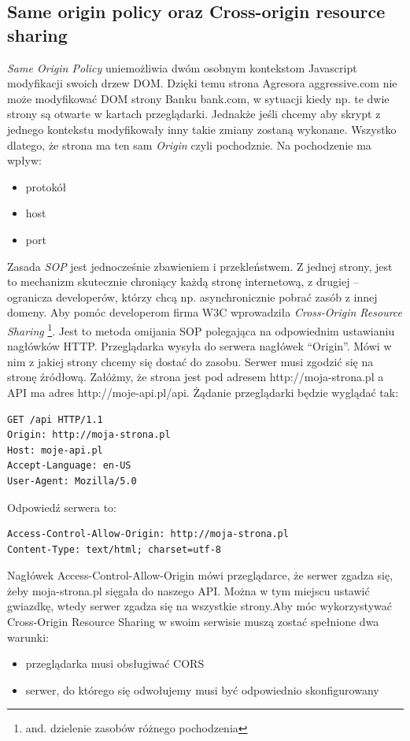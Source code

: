 \documentclass[brudnopis]{xmgr}
\begin{document}
\subsection{Same origin policy oraz Cross-origin resource sharing} 
\textit{Same Origin Policy} uniemożliwia dwóm osobnym kontekstom Javascript modyfikacji swoich drzew DOM. Dzięki temu strona Agresora aggressive.com nie może modyfikować DOM strony Banku bank.com, w sytuacji kiedy np. te dwie strony są otwarte w kartach przeglądarki. Jednakże jeśli chcemy aby skrypt z jednego kontekstu modyfikowały inny takie zmiany zostaną wykonane. Wszystko dlatego, że strona ma ten sam \textit{Origin} czyli pochodznie. Na pochodzenie ma wpływ:
\begin{itemize}
\item protokół
\item host
\item port
\end{itemize}
Zasada \textit{SOP} jest jednocześnie zbawieniem i przekleństwem. Z jednej strony, jest to mechanizm skutecznie chroniący każdą stronę internetową, z drugiej – ogranicza developerów, którzy chcą np. asynchronicznie pobrać zasób z innej domeny. Aby pomóc developerom firma W3C wprowadziła \textit{Cross-Origin Resource Sharing} \footnote{and. dzielenie zasobów różnego pochodzenia}. Jest to metoda omijania SOP polegająca na odpowiednim ustawianiu nagłówków HTTP. Przeglądarka wysyła do serwera nagłówek “Origin”. Mówi w nim z jakiej strony chcemy się dostać do zasobu. Serwer musi zgodzić się na stronę źródłową. Załóżmy, że strona jest pod adresem http://moja-strona.pl a API ma adres http://moje-api.pl/api. Żądanie przeglądarki będzie wyglądać tak:
\begin{verbatim}
GET /api HTTP/1.1
Origin: http://moja-strona.pl
Host: moje-api.pl
Accept-Language: en-US
User-Agent: Mozilla/5.0
\end{verbatim}
Odpowiedź serwera to:
\begin{verbatim}
Access-Control-Allow-Origin: http://moja-strona.pl
Content-Type: text/html; charset=utf-8
\end{verbatim}
Nagłówek Access-Control-Allow-Origin mówi przeglądarce, że serwer zgadza się, żeby moja-strona.pl sięgała do naszego API. Można w tym miejscu ustawić gwiazdkę, wtedy serwer zgadza się na wszystkie strony.Aby móc wykorzystywać Cross-Origin Resource Sharing w swoim serwisie muszą zostać spełnione dwa  warunki:
\begin{itemize}
\item przeglądarka musi obsługiwać CORS
\item serwer, do którego się odwołujemy musi być odpowiednio skonfigurowany
\end{itemize}
\end{document}
